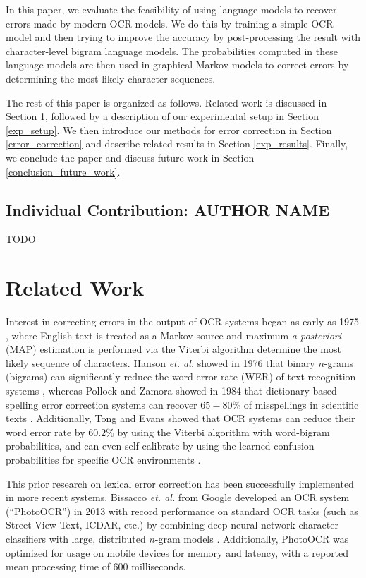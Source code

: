 \documentclass[10pt,twocolumn,letterpaper]{article}
\begin{document}
In this paper, we evaluate the feasibility of using language
models to recover errors made by modern OCR models.  We do this
by training a simple OCR model and then trying to improve the
accuracy by post-processing the result with character-level
bigram language models. The probabilities computed in these language
models are then used in graphical Markov models to correct errors by
determining the most likely character sequences.

The rest of this paper is organized as follows. Related work is
discussed in Section \ref{related_work}, followed by a
description of our experimental setup in Section \ref{exp_setup}.
We then introduce our methods for error correction in Section 
\ref{error_correction} and describe related results in
Section \ref{exp_results}. Finally, we conclude the paper and
discuss future work in Section \ref{conclusion_future_work}.

\subsection{Individual Contribution: AUTHOR NAME}
\label{individual_contribution}
TODO



\section{Related Work}
\label{related_work}

Interest in correcting errors in the output of OCR systems began as
early as 1975 \cite{Neuhoff75-TVA}, where English text is treated as
a Markov source and maximum \textit{a posteriori} (MAP) estimation
is performed via the Viterbi algorithm \cite{Forney73-TVA} determine
the most likely sequence of characters. Hanson \textit{et. al.}
showed in 1976 that binary $n$-grams (bigrams) can significantly
reduce the word error rate (WER) of text recognition systems
\cite{Hanson76-CIW}, whereas Pollock and Zamora showed in
1984 that dictionary-based spelling error correction systems
can recover $65-80\%$ of misspellings in scientific texts
\cite{Pollock84-ASC}. Additionally, Tong and Evans showed
that OCR systems can reduce their word error rate by $60.2\%$
by using the Viterbi algorithm with word-bigram probabilities, and
can even self-calibrate by using the learned confusion probabilities
for specific OCR environments \cite{Tong96-ASA}.

This prior research on lexical error correction has been successfully
implemented in more recent systems. Bissacco \textit{et. al.} from
Google developed an OCR system (``PhotoOCR'') in 2013 with record
performance on standard OCR tasks (such as Street View Text, ICDAR, etc.)
by combining deep neural network character classifiers with large,
distributed $n$-gram models \cite{Bissacco13-PRT}. Additionally, 
PhotoOCR was optimized for usage on mobile devices for memory and
latency, with a reported mean processing time of 600 milliseconds.
\end{document}
